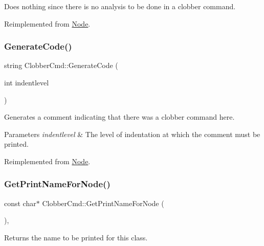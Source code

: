 Does nothing since there is no analysis to be done in a clobber command. 

Reimplemented from \hyperlink{class_node_a5f88d55c6f253a29def7ccc443d83d47}{Node}.

\mbox{\label{class_clobber_cmd_adc5627025b63c40f5ca73af8283a3e5c}} 
\subsubsection{\texorpdfstring{Generate\+Code()}{GenerateCode()}}
{\footnotesize\ttfamily string Clobber\+Cmd\+::\+Generate\+Code (\begin{DoxyParamCaption}\item[{int}]{indentlevel }\end{DoxyParamCaption})\hspace{0.3cm}{\ttfamily [virtual]}}

Generates a comment indicating that there was a clobber command here. 
\begin{DoxyParams}{Parameters}
{\em indentlevel} & The level of indentation at which the comment must be printed. \\
\hline
\end{DoxyParams}


Reimplemented from \hyperlink{class_node_acb60e526730e8436056375a3055c2c32}{Node}.

\mbox{\label{class_clobber_cmd_a3f817894d2213b11bade9b670b95ef26}} 
\subsubsection{\texorpdfstring{Get\+Print\+Name\+For\+Node()}{GetPrintNameForNode()}}
{\footnotesize\ttfamily const char$\ast$ Clobber\+Cmd\+::\+Get\+Print\+Name\+For\+Node (\begin{DoxyParamCaption}{ }\end{DoxyParamCaption})\hspace{0.3cm}{\ttfamily [inline]}, {\ttfamily [virtual]}}

Returns the name to be printed for this class. 

